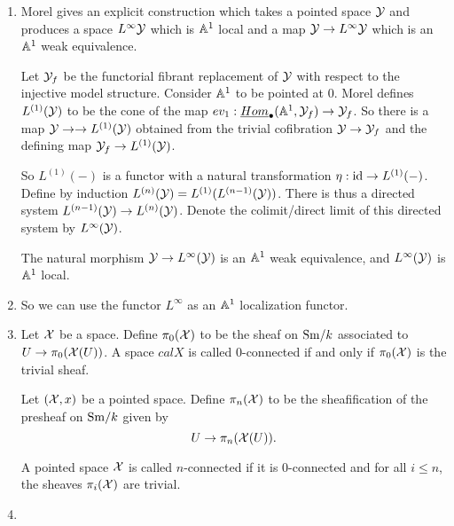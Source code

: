 \documentclass{amsart}%
\begin{document}
\begin{enumerate}
  \item Morel gives an explicit construction which takes a pointed
space $\mathcal{Y}$ and produces a space $L^{\infty}\mathcal{Y}$ which is $\mathbb{A}^1$
local and a map $\mathcal{Y} \to L^{\infty}\mathcal{Y}$ which is an $\mathbb{A}^1$ weak
equivalence.

Let $\mathcal{Y}_f$ be the functorial fibrant replacement of $\mathcal{Y}$ with
respect to the injective model structure. Consider $\mathbb{A}^1$ to be
pointed at $0$. Morel defines $L^{(1)}(\mathcal{Y})$ to be the cone of the
map $ev_1 : \underline{Hom}_{\bullet}(\mathbb{A}^1, \mathcal{Y}_f) \to \mathcal{Y}_f$.
So there is a map $\mathcal{Y} \to \to L^{(1)}(\mathcal{Y})$ obtained from the
trivial cofibration $\mathcal{Y} \to \mathcal{Y}_f$ and the defining map
$\mathcal{Y}_f \to L^{(1)}(\mathcal{Y})$. 

So $L^{(1)}(-)$ is a functor with a natural transformation
$\eta : \operatorname{id} \to L^{(1)}(-)$. Define by induction
$L^{(n)}(\mathcal{Y}) = L^{(1)}(L^{(n-1)}(\mathcal{Y}))$. There is thus a directed
system $L^{(n-1)}(\mathcal{Y}) \to L^{(n)}(\mathcal{Y})$. Denote the
colimit/direct limit of this directed system by $L^{\infty}(\mathcal{Y})$.

\begin{proposition}
  The natural morphism $\mathcal{Y} \to L^{\infty}(\mathcal{Y})$ is an $\mathbb{A}^1$
  weak equivalence, and $L^{\infty}(\mathcal{Y})$ is $\mathbb{A}^1$ local.
\end{proposition}

  \item So we can use the functor $L^{\infty}$ as an $\mathbb{A}^1$
localization functor. 

  \item 

\begin{definition}
  Let $\mathcal{X}$ be a space. Define $\pi_0(\mathcal{X})$ to be the
  sheaf on $\mathrm{Sm}/k$ associated to $U \to \pi_0(\mathcal{X}(U))$. A space
  $calX$ is called $0$-connected if and only if
  $\pi_0(\mathcal{X})$ is the trivial sheaf. 

  Let $(\mathcal{X},x)$ be a pointed space. Define
  $\pi_n(\mathcal{X})$ to be the sheafification of the presheaf
  on $\mathrm{Sm}/k$ given by
  \begin{equation*}
    U \to \pi_n(\mathcal{X}(U)).
  \end{equation*}

  A pointed space $\mathcal{X}$ is called $n$-connected if it is
  $0$-connected and for all $i\leq n$, the sheaves
  $\pi_i(\mathcal{X})$ are trivial.
\end{definition}

  \item 


\end{enumerate}
\end{document}
